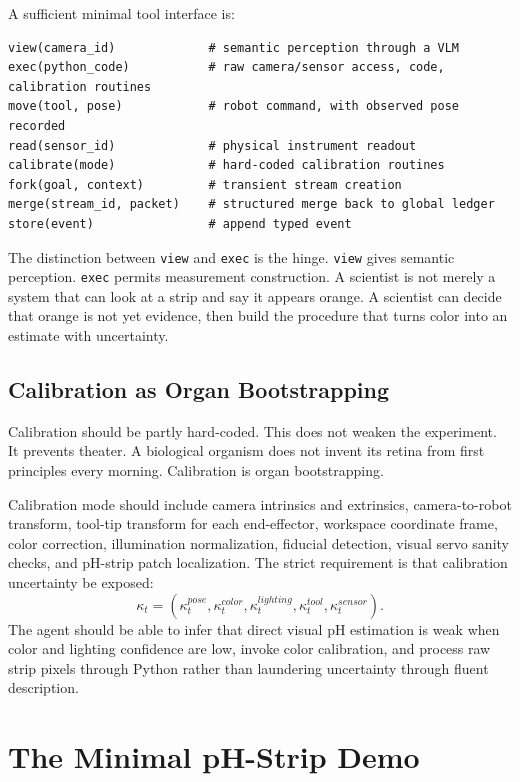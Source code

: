 \documentclass[11pt]{article}
\begin{document}
A sufficient minimal tool interface is:
\begin{lstlisting}
view(camera_id)             # semantic perception through a VLM
exec(python_code)           # raw camera/sensor access, code, calibration routines
move(tool, pose)            # robot command, with observed pose recorded
read(sensor_id)             # physical instrument readout
calibrate(mode)             # hard-coded calibration routines
fork(goal, context)         # transient stream creation
merge(stream_id, packet)    # structured merge back to global ledger
store(event)                # append typed event
\end{lstlisting}

The distinction between \texttt{view} and \texttt{exec} is the hinge. \texttt{view} gives semantic perception. \texttt{exec} permits measurement construction. A scientist is not merely a system that can look at a strip and say it appears orange. A scientist can decide that orange is not yet evidence, then build the procedure that turns color into an estimate with uncertainty.

\subsection{Calibration as Organ Bootstrapping}

Calibration should be partly hard-coded. This does not weaken the experiment. It prevents theater. A biological organism does not invent its retina from first principles every morning. Calibration is organ bootstrapping.

Calibration mode should include camera intrinsics and extrinsics, camera-to-robot transform, tool-tip transform for each end-effector, workspace coordinate frame, color correction, illumination normalization, fiducial detection, visual servo sanity checks, and pH-strip patch localization. The strict requirement is that calibration uncertainty be exposed:
\begin{equation}
  \kappa_t=(\kappa^{pose}_t,\kappa^{color}_t,\kappa^{lighting}_t,\kappa^{tool}_t,\kappa^{sensor}_t).
\end{equation}
The agent should be able to infer that direct visual pH estimation is weak when color and lighting confidence are low, invoke color calibration, and process raw strip pixels through Python rather than laundering uncertainty through fluent description.

\section{The Minimal pH-Strip Demo}
\end{document}
